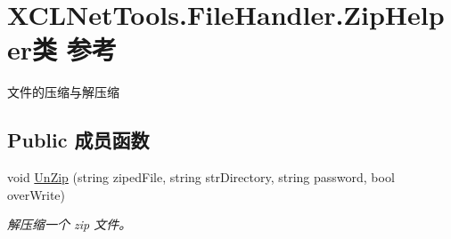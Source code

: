\hypertarget{class_x_c_l_net_tools_1_1_file_handler_1_1_zip_helper}{}\section{X\+C\+L\+Net\+Tools.\+File\+Handler.\+Zip\+Helper类 参考}
\label{class_x_c_l_net_tools_1_1_file_handler_1_1_zip_helper}


文件的压缩与解压缩  


\subsection*{Public 成员函数}
\begin{DoxyCompactItemize}
\item 
void \hyperlink{class_x_c_l_net_tools_1_1_file_handler_1_1_zip_helper_abb7dfea0a9255667f2cd9dcffcd2c226}{Un\+Zip} (string ziped\+File, string str\+Directory, string password, bool over\+Write)
\begin{DoxyCompactList}\small\item\em 解压缩一个 zip 文件。 \end{DoxyCompactList}\end{DoxyCompactItemize}
